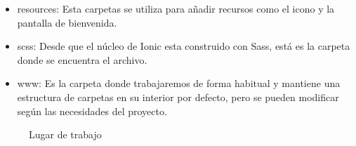 \documentclass[a4paper, 11pt]{article}
\begin{document}
\begin{itemize}
\begin{itemize}
{                      crea una aplicación de Ionic, ya hay algunos de estos módulos
                      instalados.}
                \item{resources: Esta carpetas se utiliza para añadir recursos como
                      el icono y la pantalla de bienvenida.}
                \item{scss: Desde que el núcleo de Ionic esta construido con Sass,
                      está es la carpeta donde se encuentra el archivo.}
                \item{www:  Es la carpeta donde trabajaremos de forma habitual y
                      mantiene una estructura de carpetas en su interior por
                      defecto, pero se pueden modificar según las necesidades del
                      proyecto.}
            \end{itemize}


             \begin{figure}[H]
               \centering
                    \caption{Lugar de trabajo}
                    \label{f:estructuraTrabajo}
              \end{figure}


\end{itemize}
\end{document}
